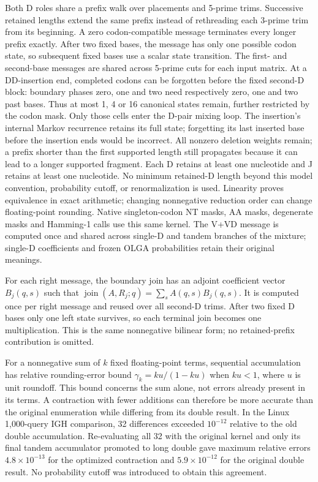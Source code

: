 \documentclass[11pt]{article}
\theoremstyle{oldplain}
\theoremstyle{oldrem}
\begin{document}
Both D roles share a prefix walk over placements and 5-prime trims. Successive
retained lengths extend the same prefix instead of rethreading each 3-prime
trim from its beginning. A zero codon-compatible message terminates every
longer prefix exactly. After two fixed bases, the message has only one possible
codon state, so subsequent fixed bases use a scalar state transition.
The first- and second-base messages are shared across 5-prime cuts for each
input matrix. At a DD-insertion end, completed codons can be forgotten before
the fixed second-D block: boundary phases zero, one and two need respectively
zero, one and two past bases. Thus at most 1, 4 or 16 canonical states remain,
further restricted by the codon mask. Only those cells enter the D-pair mixing
loop. The insertion's internal Markov recurrence retains its full state;
forgetting its last inserted base before the insertion ends would be incorrect.
All nonzero deletion weights remain; a prefix shorter than the first supported
length still propagates because it can lead to a longer supported fragment.
Each D retains at least one nucleotide and J retains at least one nucleotide.
No minimum retained-D length beyond this model convention, probability cutoff,
or renormalization is used. Linearity proves equivalence in exact arithmetic;
changing nonnegative reduction order can change floating-point rounding.
Native singleton-codon NT masks, AA masks, degenerate masks and Hamming-1 calls
use this same kernel. The V+VD message is computed once and shared across
single-D and tandem branches of the mixture; single-D coefficients and frozen
OLGA probabilities retain their original meanings.

For each right message, the boundary join has an adjoint coefficient vector
$B_j(q,s)$ such that $\operatorname{join}(A,R_j;q)=\sum_s A(q,s)B_j(q,s)$.
It is computed once per right message and reused over all second-D trims.
After two fixed D bases only one left state survives, so each terminal join
becomes one multiplication. This is the same nonnegative bilinear form;
no retained-prefix contribution is omitted.

For a nonnegative sum of $k$ fixed floating-point terms, sequential accumulation
has relative rounding-error bound $\gamma_k=ku/(1-ku)$ when $ku<1$, where
$u$ is unit roundoff. This bound concerns the sum alone, not errors already
present in its terms. A contraction with fewer additions can therefore be more
accurate than the original enumeration while differing from its double result.
In the Linux 1,000-query IGH comparison, 32 differences exceeded $10^{-12}$
relative to the old double accumulation. Re-evaluating all 32 with the original
kernel and only its final tandem accumulator promoted to long double gave
maximum relative errors $4.8\times10^{-13}$ for the optimized contraction and
$5.9\times10^{-12}$ for the original double result. No probability cutoff was
introduced to obtain this agreement.
\end{document}
